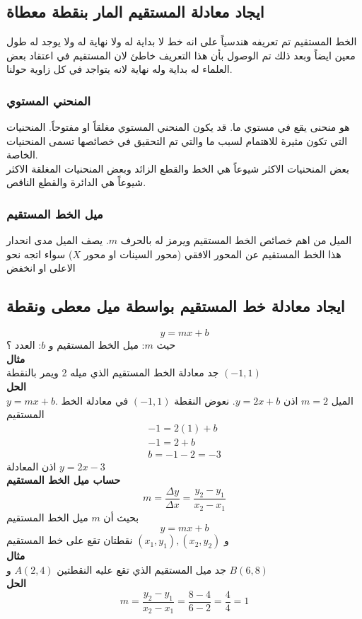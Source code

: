 \chapter{}
\section{ايجاد معادلة المستقيم المار بنقطة معطاة}
الخط المستقيم تم تعريفه هندسياً على انه خط لا بداية له ولا نهاية له ولا يوجد له طول معين ايضاً وبعد ذلك تم الوصول بأن هذا التعريف خاطئ لان المستقيم في اعتقاد بعض العلماء له بداية وله نهاية لانه يتواجد في كل زاوية حولنا.

\subsection*{المنحني المستوي}
هو منحنى يقع في مستوي ما. قد يكون المنحني المستوي مغلقاً او مفتوحاً. المنحنيات التي تكون مثيرة للاهتمام لسبب ما والتي تم التحقيق في خصائصها تسمى المنحنيات الخاصة.\\
بعض المنحنيات الاكثر شيوعاً هي الخط والقطع الزائد وبعض المنحنيات المغلقة الاكثر شيوعاً هي الدائرة والقطع الناقص.

\subsection*{ميل الخط المستقيم} 
الميل من اهم خصائص الخط المستقيم ويرمز له بالحرف $m$. يصف الميل مدى انحدار
هذا الخط المستقيم عن المحور الافقي (محور السينات او محور $X$) سواء اتجه نحو الاعلى  او انخفض

\section{ايجاد معادلة خط المستقيم بواسطة ميل معطى ونقطة}
\[
y = mx + b
\]
حيث $m$: ميل الخط المستقيم و $b$: العدد ؟\\ [10pt]
\noindent
\textbf{مثال}\\
\noindent
جد معادلة الخط المستقيم الذي ميله 2 ويمر بالنقطة 
$(-1,1)$\\
\noindent
\textbf{الحل}\\
\noindent
$y = mx + b$. الميل $m=2$ اذن $y = 2x + b$. نعوض النقطة $(-1,1)$ في معادلة الخط المستقيم
\begin{gather*}
	-1 = 2(1) + b\\
	-1 = 2+b\\
	b = -1-2 = -3
\end{gather*}
اذن المعادلة $y=2x-3$\\ [10pt]
\textbf{حساب ميل الخط المستقيم}
\[
m = \frac{\Delta y}{\Delta x} = \frac{y_2 - y_1}{x_2 - x_1}
\]
بحيث أن $m$ ميل الخط المستقيم 
\[
y = mx + b
\]
و $(x_1, y_1), (x_2, y_2)$ نقطتان تقع على خط المستقيم\\
\noindent
\textbf{مثال}\\
\noindent
جد ميل المستقيم الذي تقع عليه النقطتين $A(2,4)$ و $B(6,8)$\\
\noindent
\textbf{الحل}
\[
m = \frac{y_2 - y_1}{x_2 - x_1} = \frac{8-4 }{6-2} = \frac{4}{4} = 1
\]

